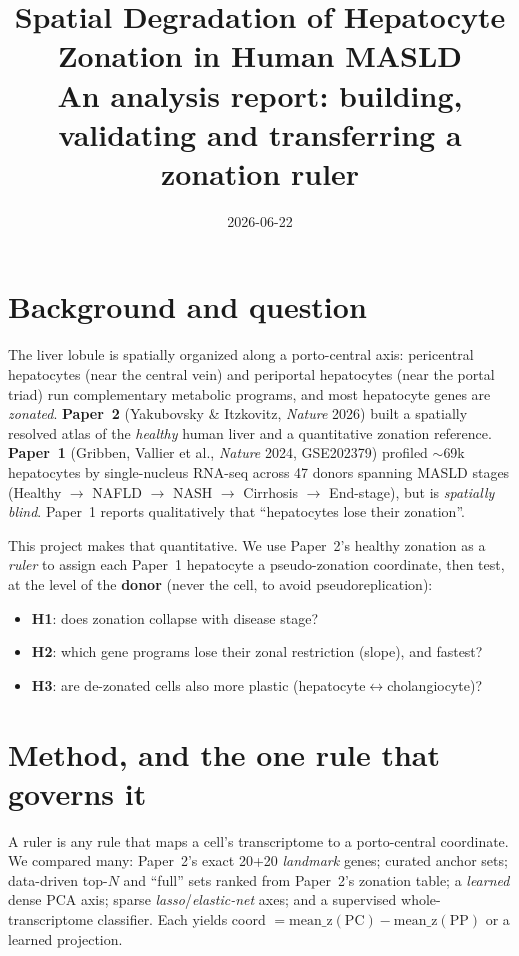 \documentclass[11pt]{article}
\title{Spatial Degradation of Hepatocyte Zonation in Human MASLD\\
\large An analysis report: building, validating and transferring a zonation ruler}
\author{}\date{2026-06-22}
\begin{document}
\maketitle

\section{Background and question}
The liver lobule is spatially organized along a porto-central axis: pericentral hepatocytes (near
the central vein) and periportal hepatocytes (near the portal triad) run complementary metabolic
programs, and most hepatocyte genes are \emph{zonated}. \textbf{Paper~2} (Yakubovsky \& Itzkovitz,
\emph{Nature} 2026) built a spatially resolved atlas of the \emph{healthy} human liver and a
quantitative zonation reference. \textbf{Paper~1} (Gribben, Vallier et al., \emph{Nature} 2024,
GSE202379) profiled $\sim$69k hepatocytes by single-nucleus RNA-seq across 47 donors spanning
MASLD stages (Healthy $\to$ NAFLD $\to$ NASH $\to$ Cirrhosis $\to$ End-stage), but is
\emph{spatially blind}. Paper~1 reports qualitatively that ``hepatocytes lose their zonation''.

This project makes that quantitative. We use Paper~2's healthy zonation as a \emph{ruler} to assign
each Paper~1 hepatocyte a pseudo-zonation coordinate, then test, at the level of the \textbf{donor}
(never the cell, to avoid pseudoreplication):
\begin{itemize}
\item \textbf{H1}: does zonation collapse with disease stage?
\item \textbf{H2}: which gene programs lose their zonal restriction (slope), and fastest?
\item \textbf{H3}: are de-zonated cells also more plastic (hepatocyte$\leftrightarrow$cholangiocyte)?
\end{itemize}

\section{Method, and the one rule that governs it}
A ruler is any rule that maps a cell's transcriptome to a porto-central coordinate. We compared
many: Paper~2's exact 20+20 \emph{landmark} genes; curated anchor sets; data-driven top-$N$ and
``full'' sets ranked from Paper~2's zonation table; a \emph{learned} dense PCA axis; sparse
\emph{lasso}/\emph{elastic-net} axes; and a supervised whole-transcriptome classifier. Each yields
coord $=\mathrm{mean\_z}(\mathrm{PC})-\mathrm{mean\_z}(\mathrm{PP})$ or a learned projection.
\end{document}
